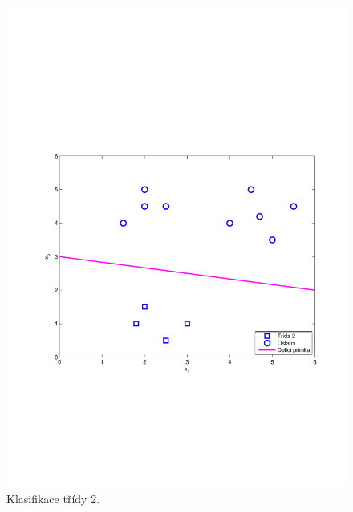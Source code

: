 \begin{figure}[!ht]
	\centering
	\begin{minipage}[b]{0.48\textwidth}
		\includegraphics[width = \textwidth, trim = 2.5cm 7cm 2cm 9cm]{./Img/BinarniRegrese/oneVSallClassification/oneVSall_2.pdf}
  		\caption{Klasifikace třídy 2.}
		\label{fig:oneVSall_2}
	\end{minipage}%
	\hfill
	\begin{minipage}[b]{0.48\textwidth}

\end{minipage}
\end{figure}
